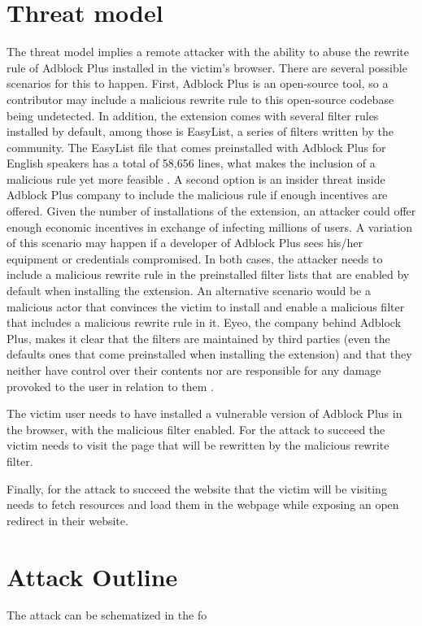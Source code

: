 \documentclass[conference]{IEEEtran}
\begin{document}
\section{Threat model}
The threat model implies a remote attacker with the ability to abuse the rewrite rule of Adblock Plus installed in the victim's browser. There are several possible scenarios for this to happen. First, Adblock Plus is an open-source tool, so a contributor may include a malicious rewrite rule to this open-source codebase being undetected. In addition, the extension comes with several filter rules installed by default, among those is EasyList, a series of filters written by the community. The EasyList file that comes preinstalled with Adblock Plus for English speakers has a total of 58,656 lines, what makes the inclusion of a malicious rule yet more feasible \cite{EasyList}. A second option is an insider threat inside Adblock Plus company to include the malicious rule if enough incentives are offered. Given the number of installations of the extension, an attacker could offer enough economic incentives in exchange of infecting millions of users. A variation of this scenario may happen if a developer of Adblock Plus sees his/her equipment or credentials compromised. In both cases, the attacker needs to include a malicious rewrite rule in the preinstalled filter lists that are enabled by default when installing the extension. 
An alternative scenario would be a malicious actor that convinces the victim to install and enable a malicious filter that includes a malicious rewrite rule in it. Eyeo, the company behind Adblock Plus, makes it clear that the filters are maintained by third parties (even the defaults ones that come preinstalled when installing the extension) and that they neither have control over their contents nor are responsible for any damage provoked to the user in relation to them \cite{abp_suscriptions}.

The victim user needs to have installed a vulnerable version of Adblock Plus in the browser, with the malicious filter enabled. For the attack to succeed the victim needs to visit the page that will be rewritten by the malicious rewrite filter.	

Finally, for the attack to succeed the website that the victim will be visiting needs to fetch resources and load them in the webpage while exposing an open redirect in their website.

\section{Attack Outline}
The attack can be schematized in the fo
\end{document}
